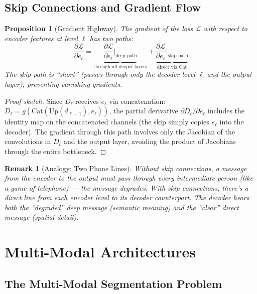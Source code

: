 \documentclass[10pt,twocolumn]{article}
\newtheorem{proposition}[definition]{Proposition}
\newtheorem{remark}[definition]{Remark}
\begin{document}
\subsection{Skip Connections and Gradient Flow}

\begin{proposition}[Gradient Highway]\label{prop:gradient}
The gradient of the loss $\mathcal{L}$ with respect to encoder features at level $\ell$ has two paths:
\begin{equation}
\frac{\partial \mathcal{L}}{\partial e_\ell} = \underbrace{\frac{\partial \mathcal{L}}{\partial e_\ell}\bigg|_{\text{deep path}}}_{\text{through all deeper layers}} + \underbrace{\frac{\partial \mathcal{L}}{\partial e_\ell}\bigg|_{\text{skip path}}}_{\text{direct via Cat}}
\end{equation}
The skip path is ``short'' (passes through only the decoder level $\ell$ and the output layer), preventing vanishing gradients.
\end{proposition}

\begin{proof}[Proof sketch]
Since $D_\ell$ receives $e_\ell$ via concatenation: $D_\ell = g(\text{Cat}(\text{Up}(d_{\ell+1}), e_\ell))$, the partial derivative $\partial D_\ell / \partial e_\ell$ includes the identity map on the concatenated channels (the skip simply copies $e_\ell$ into the decoder). The gradient through this path involves only the Jacobian of the convolutions in $D_\ell$ and the output layer, avoiding the product of Jacobians through the entire bottleneck.
\end{proof}

\begin{remark}[Analogy: Two Phone Lines]
Without skip connections, a message from the encoder to the output must pass through every intermediate person (like a game of telephone) --- the message degrades. With skip connections, there's a direct line from each encoder level to its decoder counterpart. The decoder hears both the ``degraded'' deep message (semantic meaning) and the ``clear'' direct message (spatial detail).
\end{remark}

\section{Multi-Modal Architectures}

\subsection{The Multi-Modal Segmentation Problem}
\end{document}
